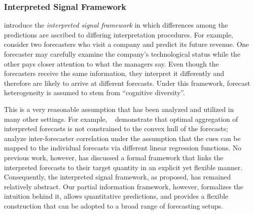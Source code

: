 \documentclass[11pt]{article}
\theoremstyle{definition}
\theoremstyle{definition}
\def\X{{\bf X}}
\begin{document}
\subsubsection{Interpreted Signal Framework}

\citet{hong2009interpreted} introduce the {\em interpreted signal
framework} in which 
differences among the 
predictions are ascribed to differing interpretation procedures.  For
example, consider two forecasters who visit a company and predict its future revenue. One forecaster may carefully examine the company's technological status while the other pays closer attention to what the managers say.  Even though the
forecasters receive the same information, they interpret it
differently and therefore are likely to arrive at different forecasts. Under this framework, forecast heterogeneity is assumed to stem from ``cognitive
diversity''.  

This is a very reasonable assumption that has been analyzed and
utilized in many other settings.  For example,
~\citet{parunak2013characterizing} demonstrate that optimal
aggregation of interpreted forecasts is not constrained to the
convex hull of the forecasts; \citet{broomell2009experts} analyze
inter-forecaster correlation under the assumption that the cues can be
mapped to the individual forecasts via different linear regression
functions.
%
No previous work, however, has discussed a formal framework that links the interpreted forecasts to their target quantity in an explicit yet flexible manner. Consequently, the interpreted signal framework, as proposed, has remained relatively abstract. Our partial information framework, however, formalizes the intuition behind it, allows quantitative predictions, and provides a flexible construction that can be adopted to a broad range of forecasting setups. 

\end{document}
